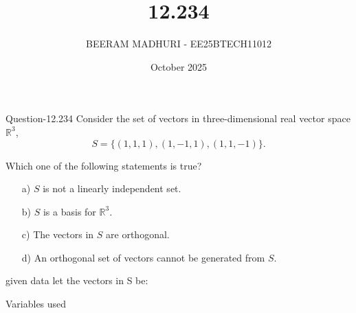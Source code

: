 \documentclass{beamer}
\title %
{12.234}
\date{October  2025}
\author %
{BEERAM MADHURI - EE25BTECH11012}
\begin{document}
\frame{\titlepage}
\begin{frame}{Question-12.234}
Consider the set of vectors in three-dimensional real vector space $\mathbb{R}^3$,
\[S = \{(1, 1, 1), (1, -1, 1), (1, 1, -1)\}.\]

Which one of the following statements is true?

\begin{enumerate}
\item[a)] $S$ is not a linearly independent set.
\item[b)] $S$ is a basis for $\mathbb{R}^3$.
\item[c)] The vectors in $S$ are orthogonal.
\item[d)] An orthogonal set of vectors cannot be generated from $S$.
\end{enumerate}
\end{frame}
 
\begin{frame}{given data}
let the vectors in S be:
\begin{table}[h!]
    \centering
    
    \caption{Variables used}
    \label{table 12.234}
\end{table}
\end{frame}
\end{document}
